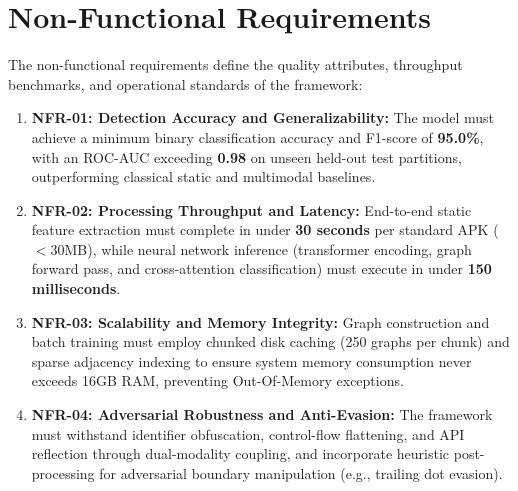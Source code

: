 \documentclass[12pt,a4paper,oneside]{report}
\begin{document}
\section{Non-Functional Requirements}
The non-functional requirements define the quality attributes, throughput benchmarks, and operational standards of the framework:
\begin{enumerate}
    \item \textbf{NFR-01: Detection Accuracy and Generalizability:} The model must achieve a minimum binary classification accuracy and F1-score of \textbf{95.0\%}, with an ROC-AUC exceeding \textbf{0.98} on unseen held-out test partitions, outperforming classical static and multimodal baselines.
    \item \textbf{NFR-02: Processing Throughput and Latency:} End-to-end static feature extraction must complete in under \textbf{30 seconds} per standard APK ($<30$MB), while neural network inference (transformer encoding, graph forward pass, and cross-attention classification) must execute in under \textbf{150 milliseconds}.
    \item \textbf{NFR-03: Scalability and Memory Integrity:} Graph construction and batch training must employ chunked disk caching (250 graphs per chunk) and sparse adjacency indexing to ensure system memory consumption never exceeds 16GB RAM, preventing Out-Of-Memory exceptions.
    \item \textbf{NFR-04: Adversarial Robustness and Anti-Evasion:} The framework must withstand identifier obfuscation, control-flow flattening, and API reflection through dual-modality coupling, and incorporate heuristic post-processing for adversarial boundary manipulation (e.g., trailing dot evasion).
\end{enumerate}
\end{document}
